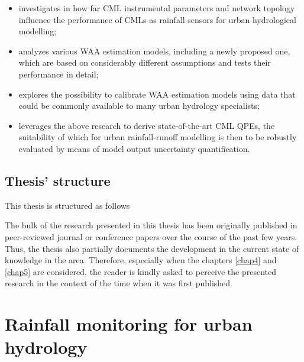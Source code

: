 \documentclass{ctuthesis}\usepackage[]{graphicx}\usepackage[]{color}
\begin{document}
\begin{itemize}
        \item investigates in how far CML instrumental parameters and network topology influence the performance of CMLs as rainfall sensors for urban hydrological modelling;
        \item analyzes various WAA estimation models, including a newly proposed one, which are based on considerably different assumptions and tests their performance in detail;
        \item explores the possibility to calibrate WAA estimation models using data that could be commonly available to many urban hydrology specialists; 
        \item leverages the above research to derive state-of-the-art CML QPEs, the suitability of which for urban rainfall-runoff modelling is then to be robustly evaluated by means of model output uncertainty quantification.
\end{itemize}


\section{Thesis' structure}

This thesis is structured as follows

\cite{pastorekReliabilityMicrowaveLink2017, pastorekPosouzeniSrazkovychDat2018}

\cite{pastorekCommercialMicrowaveLinks2019}

\cite{pastorekPrecipitationEstimatesCommercial2022}

The bulk of the research presented in this thesis has been originally published in peer-reviewed journal or conference papers over the course of the past few years. Thus, the thesis also partially documents the development in the current state of knowledge in the area. Therefore, especially when the chapters \ref{chap4} and \ref{chap5} are considered, the reader is kindly asked to perceive the presented research in the context of the time when it was first published.

        


\chapter{Rainfall monitoring for urban hydrology} \label{chap2}
\end{document}
